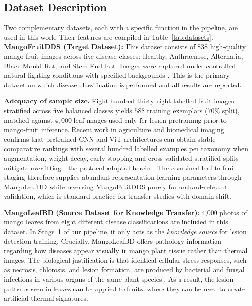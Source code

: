 \documentclass[utf8]{FrontiersinHarvard} %
\begin{document}
\subsection{Dataset Description}
Two complementary datasets, each with a specific function in the pipeline, are used in this work. Their features are compiled in Table~\ref{tab:datasets}.
\textbf{MangoFruitDDS (Target Dataset):} This dataset consists of 838 high-quality mango fruit images across five disease classes: Healthy, Anthracnose, Alternaria, Black Mould Rot, and Stem End Rot. Images were captured under controlled natural lighting conditions with specified backgrounds \cite{MendeleyDataset}. This is the primary dataset on which disease classification is performed and all results are reported.

\begingroup\color{blue}
\textbf{Adequacy of sample size.} Eight hundred thirty-eight labelled fruit images stratified across five balanced classes yields $588$ training exemplars ($70$\% split), matched against $4{,}000$ leaf images used only for lesion pretraining prior to mango-fruit inference. Recent work in agriculture and biomedical imaging confirms that pretrained CNN and ViT architectures can obtain stable comparative rankings with several hundred labelled examples per taxonomy when augmentation, weight decay, early stopping and cross-validated stratified splits mitigate overfitting---the protocol adopted herein \cite{shorten2019,thakur2022,noon2020}. The combined leaf-to-fruit staging therefore supplies abundant representation learning parameters through MangoLeafBD while reserving MangoFruitDDS purely for orchard-relevant validation, which is standard practice for transfer studies with domain shift.
\endgroup

\textbf{MangoLeafBD (Source Dataset for Knowledge Transfer):} 4,000 photos of mango leaves from eight different disease classifications are included in this dataset. In Stage~1 of our pipeline, it only acts as the \textit{knowledge source} for lesion detection training. Crucially, MangoLeafBD offers pathology information regarding how diseases appear visually in mango plant tissue rather than thermal images. The biological justification is that identical cellular stress responses, such as necrosis, chlorosis, and lesion formation, are produced by bacterial and fungal infections in various organs of the same plant species \cite{bock2010,savary2019}. As a result, the lesion patterns seen in leaves can be applied to fruits, where they can be used to create artificial thermal signatures.
\end{document}
